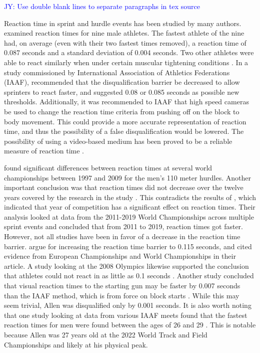 \documentclass[12pt, letterpaper, titlepage]{article}
\newcommand{\jy}[1]{\textcolor{blue}{JY: #1}}
\begin{document}
\jy{Use double blank lines to separate paragraphs in tex source}

Reaction time in sprint and hurdle events has been studied by many authors.
\citet{pain2007sprint} examined
reaction times for nine male athletes.  The
fastest athlete of the nine had, on average (even with their two fastest times 
removed), a reaction time of 0.087 seconds and a standard deviation of 0.004
seconds.  Two other athletes were able to react similarly when under certain
muscular tightening conditions \citep{pain2007sprint}. 
In a study commissioned by International Association of Athletics Federations 
(IAAF), \citet{komi2009iaaf} recommended that the disqualification 
barrier be decreased to allow sprinters to
react faster, and suggested 0.08 or 0.085 seconds as possible new thresholds.
Additionally, it was recommended to IAAF that high speed cameras be used to
change the reaction time criteria from pushing off on the block to body
movement. This could provide a more accurate representation of reaction time, 
and thus the possibility of a false disqualification would be lowered.
The possibility of using a video-based medium has been proved to be a reliable
measure of reaction time \citep{mudric2015evaluation}.


\citet{pilianidis2012start} found
significant differences between reaction times at several world championships
between 1997 and 2009 for the men's 110 meter hurdles.  Another important
conclusion was that reaction times did not decrease over the twelve years
covered by the research in the study \citep{pilianidis2012start}. This 
contradicts the results of \citet{zhang2021correlation}, which indicated that 
year of competition has a significant effect on reaction times.  Their
analysis looked at data from the 2011-2019 World Championships across multiple
sprint events and concluded that from 2011 to 2019, reaction times got
faster. However, not all studies have been in favor of a decrease in the
reaction time barrier. \citet*{brosnan2017effects} argue for increasing 
the reaction time barrier to 0.115 seconds, and cited evidence from European 
Championships and World Championships in their article.  A study looking 
at the 2008 Olympics likewise supported the conclusion that athletes could not
react in as little as 0.1 seconds \citep{lipps2011implications}.  Another study
concluded that visual reaction times to the starting gun may be faster by 0.007
seconds than the IAAF method, which is from force on block starts 
\citep{holmes2018method}.  While this may seem trivial, Allen was disqualified
only by 0.001 seconds. It is also worth noting that one study looking at data 
from various IAAF meets found that the fastest reaction times for men were found
between the ages of 26 and 29 \citep{tonnessen2013reaction}.  This is notable 
because Allen was 27 years old at the 2022 World Track and Field Championships 
and likely at his physical peak.
\end{document}
